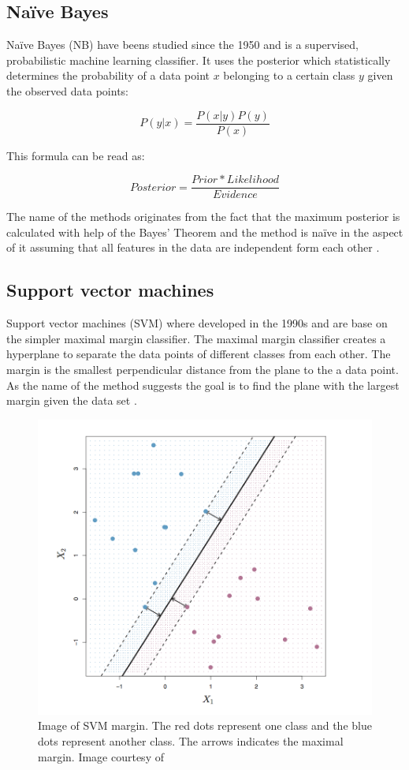 \subsection{Naïve Bayes}

Naïve Bayes (NB) have beens studied since the 1950 and is a supervised, probabilistic machine learning classifier. It uses the  posterior which statistically determines the probability of a data point $x$ belonging to a certain class $y$ given the observed data points:

\[
P(y|x) = \frac{P(x|y)P(y)}{P(x)}
\]

This formula can be read as:

\[
Posterior = \frac{Prior * Likelihood}{Evidence}
\]

The name of the methods originates from the fact that the maximum posterior is calculated with help of the Bayes' Theorem and the method is naïve in the aspect of it assuming that all features in the data are independent form each other \parencite{george2012}.


\subsection{Support vector machines}

Support vector machines (SVM) where developed in the 1990s and are base on the simpler maximal margin classifier. The maximal margin classifier creates a hyperplane to separate the data points of different classes from each other. The margin is the smallest perpendicular distance from the plane to the a data point. As the name of the method suggests the goal is to find the plane with the largest margin given the data set \textcite{James:2014}.

\begin{figure}[ht!]
  \centering
  \includegraphics[width=0.7\linewidth]{images/Margin_SVM.png}
  \caption{Image of SVM margin. The red dots represent one class and the blue dots represent another class. The arrows indicates the maximal margin. Image courtesy of \textcite{James:2014}}
  \label{fig:SVM_Margin}
\end{figure}

